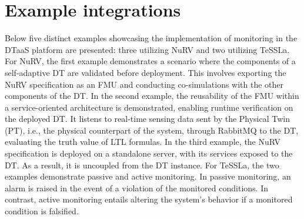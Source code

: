 \section{Example integrations}\label{sec:examples}

Below five distinct examples showcasing the implementation of monitoring in the DTaaS platform are presented:  three utilizing NuRV and two utilizing TeSSLa.
For NuRV, the first example demonstrates a scenario where the components of a self-adaptive DT are validated before deployment.
This involves exporting the NuRV specification as an FMU and conducting co-simulations with the other components of the DT.
In the second example, the reusability of the FMU within a service-oriented architecture is demonstrated, enabling runtime verification on the deployed DT.
It listens to real-time sensing data sent by the Physical Twin (PT), i.e., the physical counterpart of the system, through RabbitMQ to the DT, evaluating the truth value of LTL formulas.
In the third example, the NuRV specification is deployed on a standalone server, with its services exposed to the DT.
As a result, it is uncoupled from the DT instance.
For TeSSLa, the two examples demonstrate passive and active monitoring.
In passive monitoring, an alarm is raised in the event of a violation of the monitored conditions.
In contrast, active monitoring entails altering the system's behavior if a monitored condition is falsified.